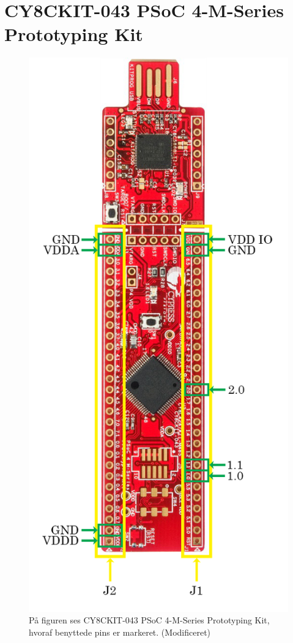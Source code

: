 \chapter{CY8CKIT-043 PSoC 4-M-Series Prototyping Kit}\vspace{-.75cm}\label{MCU_stor}
\begin{figure}[H]
	\centering
	\includegraphics[scale=1.8]{figures/qBilag/cy8ckit_PSoC_4200M.png}
	\caption{På figuren ses CY8CKIT-043 PSoC 4-M-Series Prototyping Kit, hvoraf benyttede pins er markeret. \citep{CYPRESS2016PSoC} (Modificeret)}
	\label{fig:bilag_MCU_stor}
\end{figure}